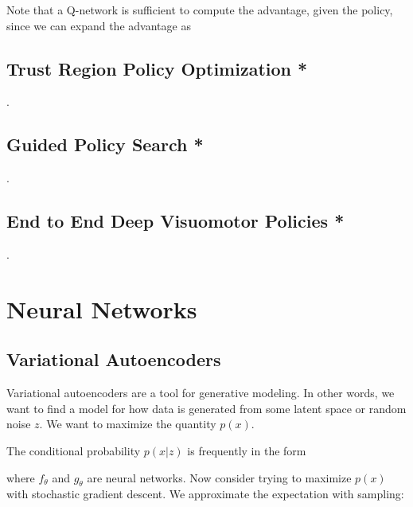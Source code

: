 \documentclass[12pt]{article}
\begin{document}

Note that a Q-network is sufficient to compute the advantage, given the policy, since we can expand the advantage as


\subsection{Trust Region Policy Optimization *}
.
\subsection{Guided Policy Search *}
.
\subsection{End to End Deep Visuomotor Policies *}
.
\section{Neural Networks}

\subsection{Variational Autoencoders}

Variational autoencoders are a tool for generative modeling. In other words, we want to find a model for how data is generated from some latent space or random noise $z$. We want to maximize the quantity $p(x)$.


The conditional probability $p(x|z)$ is frequently in the form


where $f_\theta$ and $g_\theta$ are neural networks. Now consider trying to maximize $p(x)$ with stochastic gradient descent. We approximate the expectation with sampling:
\end{document}
